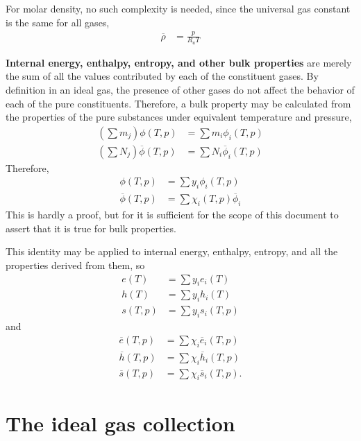 For molar density, no such complexity is needed, since the universal gas constant is the same for all gases,
\begin{align}
\overline{\rho} &= \frac{p}{R_u T}\nonumber
\end{align}

{\bf Internal energy, enthalpy, entropy, and other bulk properties} are merely the sum of all the values contributed by each of the constituent gases.  By definition in an ideal gas, the presence of other gases do not affect the behavior of each of the pure constituents.  Therefore, a bulk property may be calculated from the properties of the pure substances under equivalent temperature and pressure,
\begin{align}
\left(\sum m_j\right) \phi(T,p) &= \sum m_i \phi_i(T,p)\nonumber\\
\left(\sum N_j \right) \overline{\phi}(T,p) &= \sum N_i \overline{\phi}_i(T,p)\nonumber
\end{align}
Therefore, 
\begin{align}
\phi(T,p) &= \sum y_i \phi_i(T,p)\nonumber\\
\overline{\phi}(T,p) &= \sum \chi_i(T,p) \overline{\phi}_i\nonumber
\end{align}
This is hardly a proof, but for it is sufficient for the scope of this document to assert that it is true for bulk properties.

This identity may be applied to internal energy, enthalpy, entropy, and all the properties derived from them, so
\begin{subequations}
\begin{align}
e(T) &= \sum y_i e_i(T)\\
h(T) &= \sum y_i h_i(T)\\
s(T,p) &= \sum y_i s_i(T,p)
\end{align}
\end{subequations}
and
\begin{subequations}
\begin{align}
\overline{e}(T,p) &= \sum \chi_i \overline{e}_i(T,p)\\
\overline{h}(T,p) &= \sum \chi_i \overline{h}_i(T,p)\\
\overline{s}(T,p) &= \sum \chi_i \overline{s}_i(T,p).
\end{align}
\end{subequations}



\section{The ideal gas collection}

